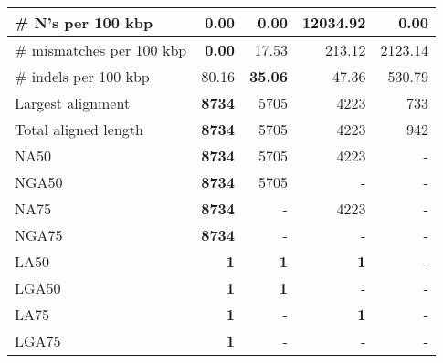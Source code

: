 \documentclass[12pt,a4paper]{article}
\begin{document}
\begin{table}[ht]
\begin{center}
\begin{tabular}{|l*{4}{|r}|}
\# N's per 100 kbp & {\bf 0.00} & {\bf 0.00} & 12034.92 & {\bf 0.00} \\ \hline
\# mismatches per 100 kbp & {\bf 0.00} & 17.53 & 213.12 & 2123.14 \\ \hline
\# indels per 100 kbp & 80.16 & {\bf 35.06} & 47.36 & 530.79 \\ \hline
Largest alignment & {\bf 8734} & 5705 & 4223 & 733 \\ \hline
Total aligned length & {\bf 8734} & 5705 & 4223 & 942 \\ \hline
NA50 & {\bf 8734} & 5705 & 4223 & - \\ \hline
NGA50 & {\bf 8734} & 5705 & - & - \\ \hline
NA75 & {\bf 8734} & - & 4223 & - \\ \hline
NGA75 & {\bf 8734} & - & - & - \\ \hline
LA50 & {\bf 1} & {\bf 1} & {\bf 1} & - \\ \hline
LGA50 & {\bf 1} & {\bf 1} & - & - \\ \hline
LA75 & {\bf 1} & - & {\bf 1} & - \\ \hline
LGA75 & {\bf 1} & - & - & - \\ \hline
\end{tabular}
\end{center}
\end{table}
\end{document}
